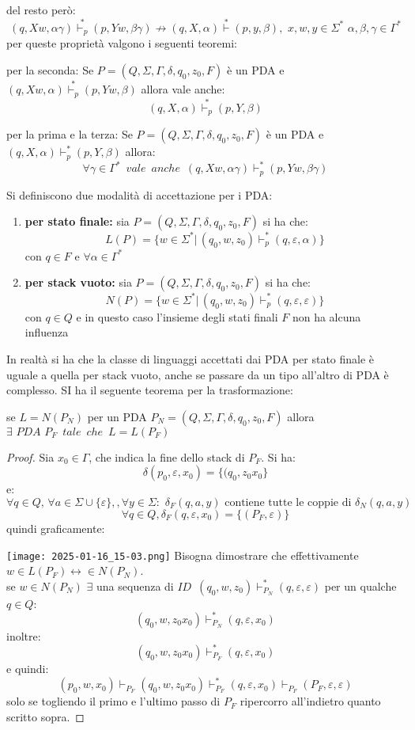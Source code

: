 	del resto però:
	$$(q,Xw,\alpha\gamma) \stackrel{*}{\vdash_p} (p,Yw,\beta\gamma)\not\to (q,X,\alpha) \stackrel{*}{\vdash}(p,y,\beta),\,\,x,w,y\in\Sigma^*\,\,\alpha,\beta,\gamma\in\Gamma^*$$
	per queste proprietà valgono i seguenti teoremi:
	\begin{theorem}
		per la seconda:
		Se $P=(Q,\Sigma,\Gamma,\delta,q_0,z_0,F)$ è un PDA e $(q,Xw,\alpha) \stackrel{*}{\vdash_p} (p,Yw,\beta)$ allora vale anche:
		$$(q,X,\alpha) \stackrel{*}{\vdash_p} (p,Y,\beta)$$
	\end{theorem}
	\begin{theorem}
		per la prima e la terza:
		Se $P=(Q,\Sigma,\Gamma,\delta,q_0,z_0,F)$ è un PDA e $(q,X,\alpha) \vdash_p^* (p,Y,\beta)$ allora:
		$$\forall\gamma\in\Gamma^*\,\,\,vale\,\,\,anche\,\,\,(q,Xw,\alpha\gamma) \vdash_p^* (p,Yw,\beta\gamma)$$
	\end{theorem}
	Si definiscono due modalità di accettazione per i PDA:
	\begin{enumerate}
		\item \textbf{per stato finale:} sia $P=(Q,\Sigma,\Gamma,\delta,q_0,z_0,F)$ si ha che:
		      $$L(P)=\{w\in\Sigma^*|\,(q_0,w,z_0) \vdash_p^* (q,\varepsilon,\alpha)\}$$
		      con $q\in F$ e $\forall \alpha\in \Gamma^*$
		\item \textbf{per stack vuoto:} sia $P=(Q,\Sigma,\Gamma,\delta,q_0,z_0,F)$ si ha che:
		      $$N(P)=\{w\in\Sigma^*|\,(q_0,w,z_0) \vdash_p^* (q,\varepsilon,\varepsilon)\}$$
		      con $q\in Q$ e in questo caso l'insieme degli stati finali $F$ non ha alcuna influenza
	\end{enumerate}
	In realtà si ha che la classe di linguaggi accettati dai PDA per stato finale è uguale a quella per stack vuoto, anche se passare da un tipo all'altro di PDA è complesso. SI ha il seguente teorema per la trasformazione:
	\begin{theorem}
		se $L=N(P_N)$ per un PDA  $P_N=(Q,\Sigma,\Gamma,\delta,q_0,z_0,F)$ allora $\exists \,\,PDA\,\,P_F\,\,\,tale\,\,\,che\,\,\,L=L(P_F)$
	\end{theorem}
	\begin{proof}
		Sia $x_0\in\Gamma$, che indica la fine dello stack di $P_F$. Si ha:
		$$\delta(p_0,\varepsilon,x_0)=\{(q_0,z_0x_0\}$$
		e:
		$$\forall q\in Q,\,\forall a\in\Sigma\cup\{\varepsilon\},,\forall y\in\Sigma:\,\,\delta_F(q,a,y)\mbox{ contiene tutte le coppie di }\delta_N(q,a,y)$$
		$$\forall q\in Q,\delta_F(q,\varepsilon,x_0)=\{(P_F,\varepsilon)\}$$
		quindi graficamente:

		\texttt{[image: 2025-01-16\_15-03.png]}
		Bisogna dimostrare che effettivamente $w\in L(P_F)\longleftrightarrow\in N(P_N)$.\\
		se $w\in N(P_N)$ $\exists$ una sequenza di $ID\,\,\,(q_0,w,z_0)\vdash_{P_N}^*(q,\varepsilon,\varepsilon)$ per un qualche $q\in Q$:
		$$(q_0,w,z_0x_0)\vdash_{P_N}^*(q,\varepsilon,x_0)$$
		inoltre:
		$$(q_0,w,z_0x_0)\vdash_{P_F}^*(q,\varepsilon,x_0)$$
		e quindi:
		$$(p_0,w,x_0)\vdash_{P_F}(q_0,w,z_0x_0)\vdash_{P_F}^*(q,\varepsilon,x_0)\vdash_{P_F}(P_F,\varepsilon,\varepsilon)$$
		solo se togliendo il primo e l'ultimo passo di $P_F$ ripercorro all'indietro quanto scritto sopra.
	\end{proof}
